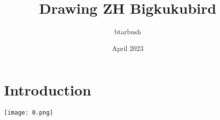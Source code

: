 \documentclass{article}
\title{Drawing ZH Bigkukubird}
\author{btarbush }
\date{April 2023}
\begin{document}
\maketitle

\section{Introduction}

\texttt{[image: 0.png]}
\end{document}
